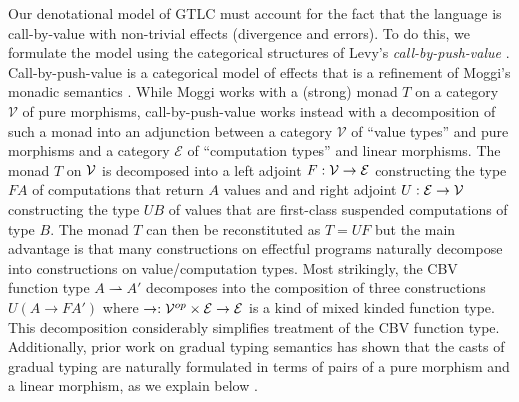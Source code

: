 Our denotational model of GTLC must account for the fact that the
language is call-by-value with non-trivial effects (divergence and
errors).  To do this, we formulate the model using the categorical
structures of Levy's \emph{call-by-push-value}
\cite{levy99}. Call-by-push-value is a categorical model of effects
that is a refinement of Moggi's monadic semantics
\cite{moggi-monads}. While Moggi works with a (strong) monad $T$ on a
category $\mathcal V$ of pure morphisms, call-by-push-value works
instead with a decomposition of such a monad into an adjunction
between a category $\mathcal V$ of ``value types'' and pure morphisms
and a category $\mathcal E$ of ``computation types'' and linear
morphisms. The monad $T$ on $\mathcal{V}$ is decomposed into a left adjoint
$F : \mathcal{V} \to \mathcal{E}$ constructing the type $F A$ of computations that
return $A$ values and and right adjoint $U : \mathcal{E} \to \mathcal{V}$
constructing the type $U B$ of values that are first-class suspended
computations of type $B$. The monad $T$ can then be reconstituted as
$T = UF$ but the main advantage is that many constructions on
effectful programs naturally decompose into constructions on
value/computation types. Most strikingly, the CBV function type $A
\rightharpoonup A'$ decomposes into the composition of three
constructions $U(A \to F A')$ where $\to : \mathcal{V}^{op} \times \mathcal{E}
\to \mathcal{E}$ is a kind of mixed kinded function type. This decomposition
considerably simplifies treatment of the CBV function
type. Additionally, prior work on gradual typing semantics has shown
that the casts of gradual typing are naturally formulated in terms of
pairs of a pure morphism and a linear morphism, as we explain below
\cite{newlicataahmed}.


